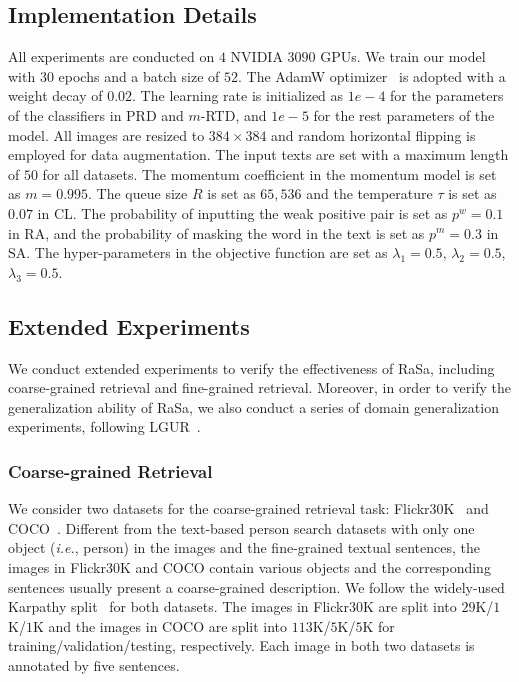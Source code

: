 \documentclass{article}
\begin{document}
\subsection{Implementation Details}
\label{Implementation Details}
All experiments are conducted on $4$ NVIDIA $3090$ GPUs.
We train our model with $30$ epochs and a batch size of $52$. 
The AdamW optimizer~\cite{loshchilov2018decoupled} is adopted with a weight decay of $0.02$. 
The learning rate is initialized as $1e-4$ for the parameters of the classifiers in PRD and $m$-RTD, and $1e-5$ for the rest parameters of the model.
All images are resized to $384\times384$ and random horizontal flipping is employed for data augmentation.
The input texts are set with a maximum length of $50$ for all datasets.
The momentum coefficient in the momentum model is set as $m=0.995$.
The queue size $R$ is set as $65,536$ and the temperature $\tau$ is set as $0.07$ in CL.
The probability of inputting the weak positive pair is set as $p^{w}=0.1$ in RA, and the probability of masking the word in the text is set as $p^{m}=0.3$ in SA.
The hyper-parameters in the objective function are set as $\lambda_1=0.5$, $\lambda_2=0.5$, $\lambda_3=0.5$.  

\subsection{Extended Experiments}
\label{Extended Experiments}
We conduct extended experiments to verify the effectiveness of RaSa, including coarse-grained retrieval and fine-grained retrieval. 
Moreover, in order to verify the generalization ability of RaSa, we also conduct a series of domain generalization experiments, following LGUR~\cite{shao2022learning}.


\subsubsection{Coarse-grained Retrieval}
We consider two datasets for the coarse-grained retrieval task: Flickr30K~\cite{plummer2015flickr30k} and COCO~\cite{lin2014microsoft}.
Different from the text-based person search datasets with only one object (\emph{i.e.}, person) in the images and the fine-grained textual sentences, the images in Flickr30K and COCO contain various objects and the corresponding sentences usually present a coarse-grained description.
We follow the widely-used Karpathy split~\cite{karpathy2015deep} for both datasets.
The images in Flickr30K are split into $29$K/$1$K/$1$K and the images in COCO are split into $113$K/$5$K/$5$K for training/validation/testing, respectively.
Each image in both two datasets is annotated by five sentences.
\end{document}
